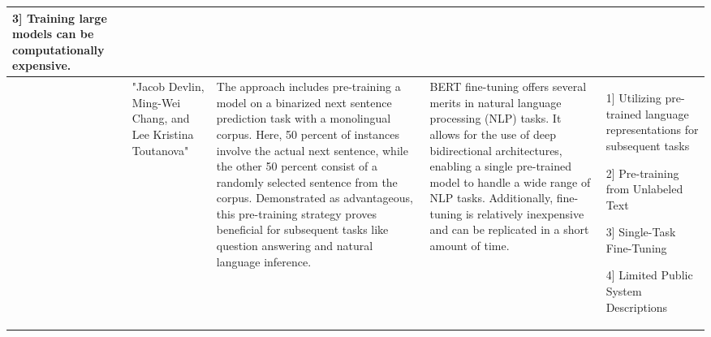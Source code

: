 \documentclass[conference]{IEEEtran}
\begin{document}
\begin{table}
\begin{center}
\begin{tabular}{ |p{1cm}|p{2cm}|p{4cm}|p{4cm}|p{4cm}| }
3] Training large models can be computationally expensive. \\
\hline
[23] & "Jacob Devlin, Ming-Wei Chang, and Lee Kristina Toutanova" & The approach includes pre-training a model on a binarized next sentence prediction task with a monolingual corpus. Here, 50 percent of instances involve the actual next sentence, while the other 50 percent consist of a randomly selected sentence from the corpus. Demonstrated as advantageous, this pre-training strategy proves beneficial for subsequent tasks like question answering and natural language inference.& BERT fine-tuning offers several merits in natural language processing (NLP) tasks. It allows for the use of deep bidirectional architectures, enabling a single pre-trained model to handle a wide range of NLP tasks. Additionally, fine-tuning is relatively inexpensive and can be replicated in a short amount of time. & 1] Utilizing pre-trained language representations for subsequent tasks

2] Pre-training from Unlabeled Text

3] Single-Task Fine-Tuning

4]  Limited Public System Descriptions
 \\
\hline

\end{tabular}
\end{center}
\end{table}
\end{document}
